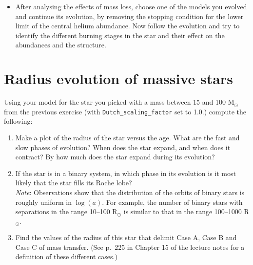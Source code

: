 \documentclass[11pt,a4paper]{article}
\begin{document}
\begin{itemize}
\item After analysing the effects of mass loss, choose one of the models you evolved and continue its evolution, by removing the stopping condition for the lower limit of the central helium abundance. 
Now follow the evolution and try to identify the different burning stages in the star and their effect on the abundances and the structure. 

\end{itemize}


\section{Radius evolution of massive stars}

Using your model for the star you picked with a mass between 15 and 100 M$_\odot$ from the previous exercise (with \verb|Dutch_scaling_factor| set to 1.0.) compute the following:

\begin{enumerate}[label=(\alph*)]
\item Make a plot of the radius of the star versus the age. What are the fast and slow phases of evolution? When does the star expand, and when does it contract? By how much does the star expand during its evolution?
\item If the star is in a binary system, in which phase in its evolution is it most likely that the star fills its Roche lobe?\\
\textit{Note}: Observations show that the distribution of the orbits of binary stars is roughly uniform in $\log(a)$. For example, the number of binary stars with separations in the range 10--100 R$_\odot$ is similar to that in the range 100--1000 R$_\odot$.
\item Find the values of the radius of this star that delimit Case A, Case B and Case C of mass transfer. (See p.\ 225 in Chapter 15 of the lecture notes for a definition of these different cases.)
\end{enumerate}
\end{document}
